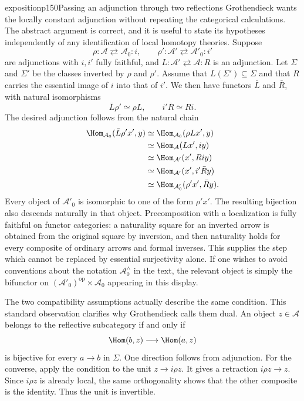 \begin{dcomment}{exposition}{p150}{Passing an adjunction through two reflections}
Grothendieck wants the locally constant adjunction without repeating the categorical calculations. The abstract argument is correct, and it is useful to state its hypotheses independently of any identification of local homotopy theories. Suppose
\[
 \rho:\mathcal A\rightleftarrows\mathcal A_0:i,
 \qquad
 \rho':\mathcal A'\rightleftarrows\mathcal A'_0:i'
\]
are adjunctions with $i,i'$ fully faithful, and $L:\mathcal A'\rightleftarrows\mathcal A:R$ is an adjunction. Let $\Sigma$ and $\Sigma'$ be the classes inverted by $\rho$ and $\rho'$. Assume that $L(\Sigma')\subseteq\Sigma$ and that $R$ carries the essential image of $i$ into that of $i'$. We then have functors $\bar L$ and $\bar R$, with natural isomorphisms
\[
 \bar L\rho'\simeq\rho L,
 \qquad i'\bar R\simeq Ri.
\]
The desired adjunction follows from the natural chain
\[
\begin{aligned}
 \Hom_{\mathcal A_0}(\bar L\rho' x',y)
 &\simeq\Hom_{\mathcal A_0}(\rho Lx',y)\\
 &\simeq\Hom_{\mathcal A}(Lx',iy)\\
 &\simeq\Hom_{\mathcal A'}(x',Riy)\\
 &\simeq\Hom_{\mathcal A'}(x',i'\bar Ry)\\
 &\simeq\Hom_{\mathcal A'_0}(\rho'x',\bar Ry).
\end{aligned}
\]
Every object of $\mathcal A'_0$ is isomorphic to one of the form $\rho'x'$. The resulting bijection also descends naturally in that object. Precomposition with a localization is fully faithful on functor categories: a naturality square for an inverted arrow is obtained from the original square by inversion, and then naturality holds for every composite of ordinary arrows and formal inverses. This supplies the step which cannot be replaced by essential surjectivity alone. If one wishes to avoid conventions about the notation $\mathcal A_0^{\wedge}$ in the text, the relevant object is simply the bifunctor on $(\mathcal A'_0)^{\mathrm{op}}\times\mathcal A_0$ appearing in this display.

The two compatibility assumptions actually describe the same condition. This standard observation clarifies why Grothendieck calls them dual. An object $z\in\mathcal A$ belongs to the reflective subcategory if and only if
\[
 \Hom(b,z)\longrightarrow\Hom(a,z)
\]
is bijective for every $a\longrightarrow b$ in $\Sigma$. One direction follows from adjunction. For the converse, apply the condition to the unit $z\longrightarrow i\rho z$. It gives a retraction $i\rho z\longrightarrow z$. Since $i\rho z$ is already local, the same orthogonality shows that the other composite is the identity. Thus the unit is invertible.


\end{dcomment}
